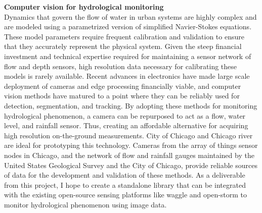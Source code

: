 \noindent \textbf{Computer vision for hydrological monitoring}\\
Dynamics that govern the flow of water in urban systems are highly complex and are modeled using a parametrized version of simplified Navier-Stokes equations.
These model parameters require frequent calibration and validation to ensure that they accurately represent the physical system.
Given the steep financial investment and technical expertise required for maintaining a sensor network of flow and depth sensors, high resolution data necessary for calibrating these models is rarely available.
Recent advances in electronics have made large scale deployment of cameras and edge processing financially viable, and computer vision methods have matured to a point where they can be reliably used for detection, segmentation, and tracking.
By adopting these methods for monitoring hydrological phenomenon, a camera can be repurposed to act as a flow, water level, and rainfall sensor.
Thus, creating an affordable alternative for acquiring high resolution on-the-ground measurements. 
City of Chicago and Chicago river are ideal for prototyping this technology.
Cameras from the array of things sensor nodes in Chicago, and the network of flow and rainfall gauges maintained by the  United States Geological Survey and the City of Chicago, provide reliable sources of data for the development and validation of these methods.
As a deliverable from this project, I hope to create a standalone library that can be integrated with the existing open-source sensing platforms like waggle and open-storm to monitor hydrological phenomenon using image data. 

\

